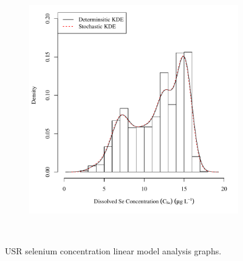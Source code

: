 \begin{linenumbers}
\begin{landscape}
\begin{figure}
\begin{subfigure}{0.7\textwidth}
			\includegraphics[width=\tableCustomSize]{"Figures/Results_USR/Stochastic/c d&s est CON"}
		\end{subfigure}\\
		\caption{USR selenium concentration linear model analysis graphs.}
	\end{figure}
\end{landscape}


\end{linenumbers}
